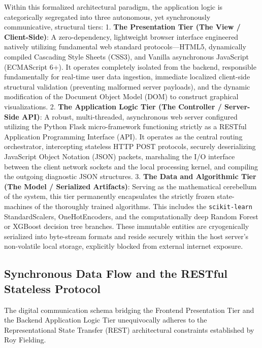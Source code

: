 Within this formalized architectural paradigm, the application logic is
categorically segregated into three autonomous, yet synchronously
communicative, structural tiers: 1. \textbf{The Presentation Tier (The
View / Client-Side)}: A zero-dependency, lightweight browser interface
engineered natively utilizing fundamental web standard
protocols---HTML5, dynamically compiled Cascading Style Sheets (CSS3),
and Vanilla asynchronous JavaScript (ECMAScript 6+). It operates
completely isolated from the backend, responsible fundamentally for
real-time user data ingestion, immediate localized client-side
structural validation (preventing malformed server payloads), and the
dynamic modification of the Document Object Model (DOM) to construct
graphical visualizations. 2. \textbf{The Application Logic Tier (The
Controller / Server-Side API)}: A robust, multi-threaded, asynchronous
web server configured utilizing the Python Flask micro-framework
functioning strictly as a RESTful Application Programming Interface
(API). It operates as the central routing orchestrator, intercepting
stateless HTTP POST protocols, securely deserializing JavaScript Object
Notation (JSON) packets, marshaling the I/O interface between the client
network sockets and the local processing kernel, and compiling the
outgoing diagnostic JSON structures. 3. \textbf{The Data and Algorithmic
Tier (The Model / Serialized Artifacts)}: Serving as the mathematical
cerebellum of the system, this tier permanently encapsulates the
strictly frozen state-machines of the thoroughly trained algorithms.
This includes the \texttt{scikit-learn} StandardScalers, OneHotEncoders,
and the computationally deep Random Forest or XGBoost decision tree
branches. These immutable entities are cryogenically serialized into
byte-stream formats and reside securely within the host server's
non-volatile local storage, explicitly blocked from external internet
exposure.

\hypertarget{synchronous-data-flow-and-the-restful-stateless-protocol}{%
\subsection{Synchronous Data Flow and the RESTful Stateless
Protocol}\label{synchronous-data-flow-and-the-restful-stateless-protocol}}

The digital communication schema bridging the Frontend Presentation Tier
and the Backend Application Logic Tier unequivocally adheres to the
Representational State Transfer (REST) architectural constraints
established by Roy Fielding.

